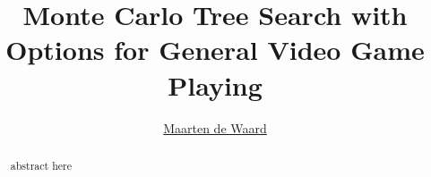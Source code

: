 \documentclass[a4]{report}
\title{Monte Carlo Tree Search with Options for General Video Game Playing}
\author{\href{mailto:mrtndwrd@gmail.com}{Maarten de Waard}}
\begin{document}

\maketitle

\begin{abstract}
	abstract here
\end{abstract}

\tableofcontents











%


\end{document}
